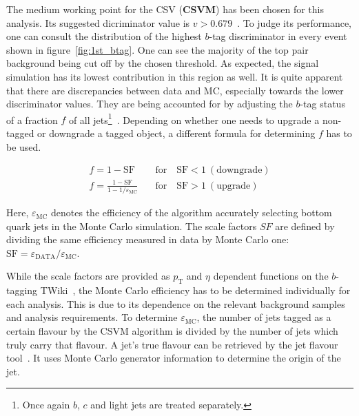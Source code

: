 The medium working point for the CSV (\textbf{CSVM}) has been chosen for this analysis. Its suggested dicriminator value is $v > 0.679$~\cite{btagworkp}. To judge its performance, one can consult the distribution of the highest $b$-tag discriminator in every event shown in figure~\ref{fig:1st_btag}. One can see the majority of the top pair background being cut off by the chosen threshold. As expected, the signal simulation has its lowest contribution in this region as well. It is quite apparent that there are discrepancies between data and MC, especially towards the lower discriminator values. They are being accounted for by adjusting the $b$-tag status of a fraction $f$ of all jets\footnote{Once again $b$, $c$ and light jets are treated separately.}~\cite{btageff}. Depending on whether one needs to upgrade a non-tagged or downgrade a tagged object, a different formula for determining $f$ has to be used.

\begin{align}
  \label{eq:btagsf}
  f = 1 - \text{SF} \quad & \text{for} \quad \text{SF} < 1\:(\text{downgrade}) \\
  f = \frac{1 - \text{SF}}{1- 1/\varepsilon_{\text{MC}}} \quad & \text{for} \quad \text{SF} > 1\:(\text{upgrade})
\end{align}

\noindent Here, $\varepsilon_{\text{MC}}$ denotes the efficiency of the algorithm accurately selecting bottom quark jets in the Monte Carlo simulation. The scale factors $SF$ are defined by dividing the same efficiency measured in data by Monte Carlo one: $\text{SF} = \varepsilon_{\text{DATA}} / \varepsilon_{\text{MC}}$.

While the scale factors are provided as $p_{\text{T}}$ and $\eta$ dependent functions on the $b$-tagging TWiki~\cite{btagtwiki}, the Monte Carlo efficiency has to be determined individually for each analysis. This is due to its dependence on the relevant background samples and analysis requirements. To determine $\varepsilon_{\text{MC}}$, the number of jets tagged as a certain flavour by the CSVM algorithm is divided by the number of jets which truly carry that flavour. A jet's true flavour can be retrieved by the jet flavour tool~\cite{jetflavtool}. It uses Monte Carlo generator information to determine the origin of the jet.

